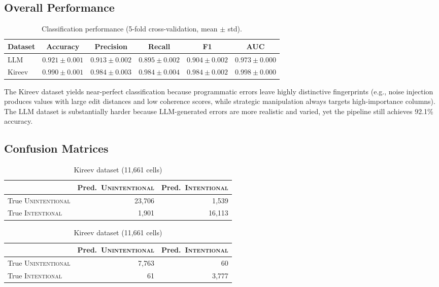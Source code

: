 \documentclass[11pt,a4paper]{article}
\newcommand{\intentional}{\textsc{Intentional}}
\newcommand{\unintentional}{\textsc{Unintentional}}
\begin{document}
\subsection{Overall Performance}

\begin{table}[h]
\centering
\caption{Classification performance (5-fold cross-validation, mean $\pm$ std).}
\label{tab:results}
\begin{tabular}{@{}lccccc@{}}
\toprule
\textbf{Dataset} & \textbf{Accuracy} & \textbf{Precision} & \textbf{Recall} & \textbf{F1} & \textbf{AUC} \\
\midrule
LLM    & $0.921 \pm 0.001$ & $0.913 \pm 0.002$ & $0.895 \pm 0.002$ & $0.904 \pm 0.002$ & $0.973 \pm 0.000$ \\
Kireev & $0.990 \pm 0.001$ & $0.984 \pm 0.003$ & $0.984 \pm 0.004$ & $0.984 \pm 0.002$ & $0.998 \pm 0.000$ \\
\bottomrule
\end{tabular}
\end{table}

The Kireev dataset yields near-perfect classification because programmatic
errors leave highly distinctive fingerprints (e.g., noise injection produces
values with large edit distances and low coherence scores, while strategic
manipulation always targets high-importance columns).  The LLM dataset is
substantially harder because LLM-generated errors are more realistic and
varied, yet the pipeline still achieves 92.1\% accuracy.

\subsection{Confusion Matrices}

\begin{table}[h]
\centering
\caption{Aggregated confusion matrices across all 5 folds.}
\label{tab:confusion}
\small
\begin{subtable}[t]{0.48\textwidth}
\centering
\caption{LLM dataset (43{,}259 cells)}
\begin{tabular}{@{}lrr@{}}
\toprule
 & Pred.\ \unintentional{} & Pred.\ \intentional{} \\
\midrule
True \unintentional{} & 23{,}706 & 1{,}539 \\
True \intentional{} & 1{,}901 & 16{,}113 \\
\bottomrule
\end{tabular}
\end{subtable}
\hfill
\begin{subtable}[t]{0.48\textwidth}
\centering
\caption{Kireev dataset (11{,}661 cells)}
\begin{tabular}{@{}lrr@{}}
\toprule
 & Pred.\ \unintentional{} & Pred.\ \intentional{} \\
\midrule
True \unintentional{} & 7{,}763 & 60 \\
True \intentional{} & 61 & 3{,}777 \\
\bottomrule
\end{tabular}
\end{subtable}
\end{table}
\end{document}
